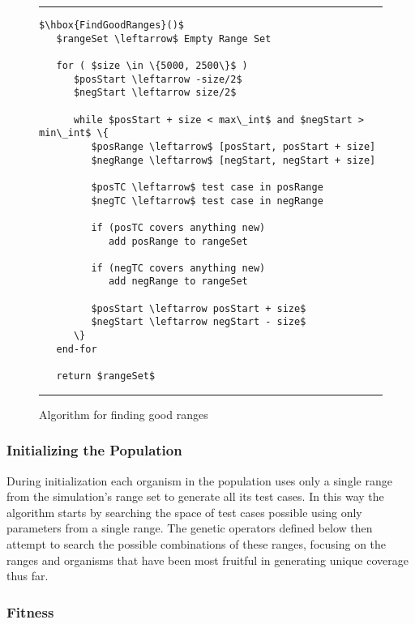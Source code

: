 \documentclass[runningheads]{llncs}
\begin{document}
\begin{figure}[h!]
\begin{center}
\hrule
\medskip
\begin{Verbatim}[fontfamily=tt, xleftmargin=10pt, commandchars=\\\{\},
codes={\catcode`$=3\catcode`^=7\catcode`_=8}]
$\hbox{FindGoodRanges}()$  
   $rangeSet \leftarrow$ Empty Range Set
		
   for ( $size \in \{5000, 2500\}$ ) 
      $posStart \leftarrow -size/2$
      $negStart \leftarrow size/2$
		
      while $posStart + size < max\_int$ and $negStart > min\_int$ \{
         $posRange \leftarrow$ [posStart, posStart + size]
         $negRange \leftarrow$ [negStart, negStart + size]
		
         $posTC \leftarrow$ test case in posRange
         $negTC \leftarrow$ test case in negRange
		
         if (posTC covers anything new)
            add posRange to rangeSet
		
         if (negTC covers anything new)
            add negRange to rangeSet
		
         $posStart \leftarrow posStart + size$
         $negStart \leftarrow negStart - size$
      \}
   end-for
		
   return $rangeSet$
\end{Verbatim}
\hrule
\end{center}
\caption{Algorithm for finding good ranges \label{fig:ranges}}
\end{figure}
\FloatBarrier

\subsubsection{Initializing the Population}

During initialization each organism in the population uses only a single range from the simulation's range set to generate all its test cases. In this way the algorithm starts by searching the space of test cases possible using only parameters from a single range. The genetic operators defined below then attempt to search the possible combinations of these ranges, focusing on the ranges and organisms that have been most fruitful in generating unique coverage thus far.

\subsubsection{Fitness}
\end{document}
